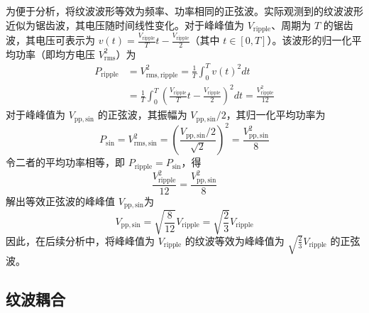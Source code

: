 \documentclass[twocolumn]{ctexart}
\begin{document}
为便于分析，将纹波波形等效为频率、功率相同的正弦波。实际观测到的纹波波形近似为锯齿波，其电压随时间线性变化。对于峰峰值为 $V_{\mathrm{ripple}}$、周期为 $T$ 的锯齿波，其电压可表示为 $v(t) = \frac{V_{\mathrm{ripple}}}{T}t - \frac{V_{\mathrm{ripple}}}{2}$（其中 $t \in [0, T]$）。该波形的归一化平均功率（即均方电压 $V_{\mathrm{rms}}^2$）为
\begin{align*}
P_{\mathrm{ripple}} &= V_{\mathrm{rms,ripple}}^2 = \frac{1}{T}\int_0^T v(t)^2 dt \\
&= \frac{1}{T}\int_0^T \left(\frac{V_{\mathrm{ripple}}}{T}t - \frac{V_{\mathrm{ripple}}}{2}\right)^2 dt = \frac{V_{\mathrm{ripple}}^2}{12}
\end{align*}
对于峰峰值为 $V_{\mathrm{pp,sin}}$ 的正弦波，其振幅为 $V_{\mathrm{pp,sin}}/2$，其归一化平均功率为
\begin{equation*}
P_{\mathrm{sin}} = V_{\mathrm{rms,sin}}^2 = \left(\frac{V_{\mathrm{pp,sin}}/2}{\sqrt{2}}\right)^2 = \frac{V_{\mathrm{pp,sin}}^2}{8}
\end{equation*}
令二者的平均功率相等，即 $P_{\mathrm{ripple}} = P_{\mathrm{sin}}$，得
\begin{equation*}
\frac{V_{\mathrm{ripple}}^2}{12} = \frac{V_{\mathrm{pp,sin}}^2}{8}
\end{equation*}
解出等效正弦波的峰峰值 $V_{\mathrm{pp,sin}}$为
\begin{equation*}
V_{\mathrm{pp,sin}} = \sqrt{\frac{8}{12}}V_{\mathrm{ripple}} = \sqrt{\frac{2}{3}}V_{\mathrm{ripple}}
\end{equation*}
因此，在后续分析中，将峰峰值为 $V_{\mathrm{ripple}}$ 的纹波等效为峰峰值为 $\sqrt{\frac{2}{3}}V_{\mathrm{ripple}}$ 的正弦波。

\subsection{纹波耦合}
\end{document}

